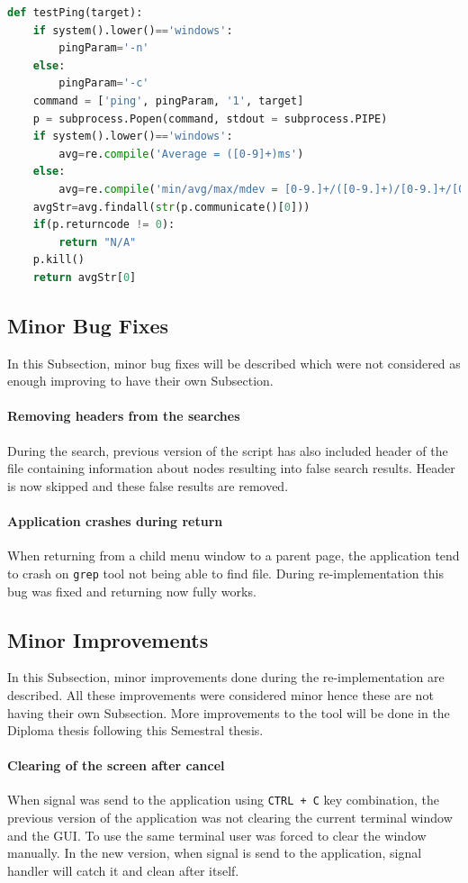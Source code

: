\begin{minipage}{\linewidth}
\begin{lstlisting}[language=Python, numbers=none, label={lst:testping}, caption=Function testPing, frame=single, showstringspaces=false, breaklines=true]
def testPing(target):
	if system().lower()=='windows':
		pingParam='-n'
	else:
		pingParam='-c'
	command = ['ping', pingParam, '1', target]
	p = subprocess.Popen(command, stdout = subprocess.PIPE)
	if system().lower()=='windows':
		avg=re.compile('Average = ([0-9]+)ms')
	else:
		avg=re.compile('min/avg/max/mdev = [0-9.]+/([0-9.]+)/[0-9.]+/[0-9.]+')
	avgStr=avg.findall(str(p.communicate()[0]))
	if(p.returncode != 0):
		return "N/A"
	p.kill()
	return avgStr[0]
\end{lstlisting}
\end{minipage} 

\subsection{Minor Bug Fixes}
In this Subsection, minor bug fixes will be described which were not considered as enough improving to have their own Subsection. 
\paragraph{Removing headers from the searches}
During the search, previous version of the script has also included header of the file containing information about nodes resulting into false search results. Header is now skipped and these false results are removed.
\paragraph{Application crashes during return}
When returning from a child menu window to a parent page, the application tend to crash on \texttt{grep} tool not being able to find file. During re-implementation this bug was fixed and returning now fully works.
\subsection{Minor Improvements}
In this Subsection, minor improvements done during the re-implementation are described. All these improvements were considered minor hence these are not having their own Subsection. More improvements to the tool will be done in the Diploma thesis following this Semestral thesis.
\paragraph{Clearing of the screen after cancel}
When signal was send to the application using \texttt{CTRL + C} key combination, the previous version of the application was not clearing the current terminal window and the GUI. To use the same terminal user was forced to clear the window manually. In the new version, when signal is send to the application, signal handler will catch it and clean after itself.
